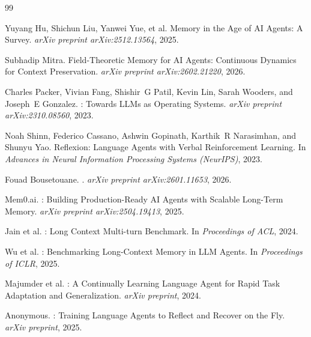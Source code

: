 \documentclass[11pt,a4paper]{article}
\begin{document}
\begin{thebibliography}{99}

Yuyang Hu, Shichun Liu, Yanwei Yue, et al.
\newblock Memory in the Age of AI Agents: A Survey.
\newblock \emph{arXiv preprint arXiv:2512.13564}, 2025.

Subhadip Mitra.
\newblock Field-Theoretic Memory for AI Agents: Continuous Dynamics for Context Preservation.
\newblock \emph{arXiv preprint arXiv:2602.21220}, 2026.

Charles Packer, Vivian Fang, Shishir~G Patil, Kevin Lin, Sarah Wooders, and Joseph~E Gonzalez.
: Towards LLMs as Operating Systems.
\newblock \emph{arXiv preprint arXiv:2310.08560}, 2023.

Noah Shinn, Federico Cassano, Ashwin Gopinath, Karthik~R Narasimhan, and Shunyu Yao.
\newblock Reflexion: Language Agents with Verbal Reinforcement Learning.
\newblock In \emph{Advances in Neural Information Processing Systems (NeurIPS)}, 2023.

Fouad Bousetouane.
.
\newblock \emph{arXiv preprint arXiv:2601.11653}, 2026.

Mem0.ai.
: Building Production-Ready AI Agents with Scalable Long-Term Memory.
\newblock \emph{arXiv preprint arXiv:2504.19413}, 2025.

{Jain et al.}
: Long Context Multi-turn Benchmark.
\newblock In \emph{Proceedings of ACL}, 2024.

{Wu et al.}
: Benchmarking Long-Context Memory in LLM Agents.
\newblock In \emph{Proceedings of ICLR}, 2025.

{Majumder et al.}
: A Continually Learning Language Agent for Rapid Task Adaptation and Generalization.
\newblock \emph{arXiv preprint}, 2024.

{Anonymous}.
: Training Language Agents to Reflect and Recover on the Fly.
\newblock \emph{arXiv preprint}, 2025.

\end{thebibliography}
\end{document}
